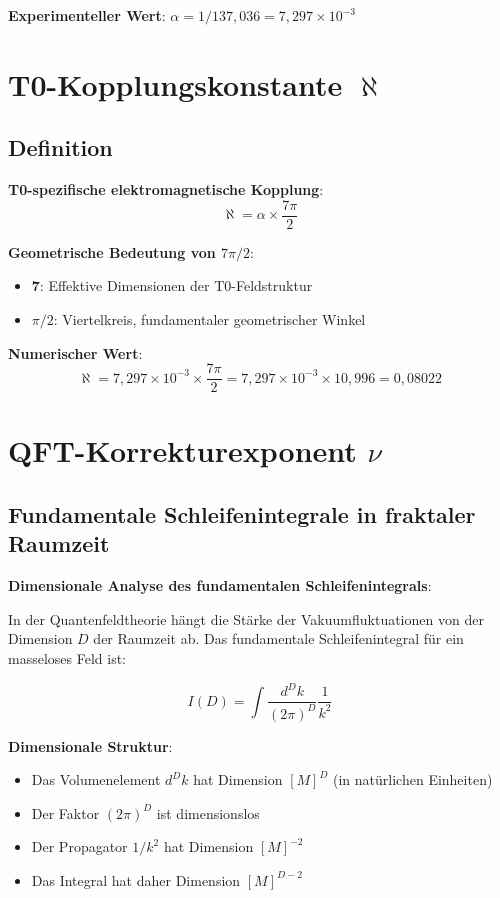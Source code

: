 \documentclass[12pt,a4paper]{article}
\newcommand{\alphagem}{\alpha}
\newcommand{\nulep}{\nu}
\begin{document}
	\textbf{Experimenteller Wert}: $\alphagem = 1/137{,}036 = 7{,}297 \times 10^{-3}$
	
	\section{T0-Kopplungskonstante $\aleph$}
	
	\subsection{Definition}
	
	\textbf{T0-spezifische elektromagnetische Kopplung}:
	\begin{equation}
		\aleph = \alphagem \times \frac{7\pi}{2}
	\end{equation}
	
	\textbf{Geometrische Bedeutung von $7\pi/2$}:
	\begin{itemize}
		\item \textbf{7}: Effektive Dimensionen der T0-Feldstruktur
		\item \textbf{$\pi/2$}: Viertelkreis, fundamentaler geometrischer Winkel
	\end{itemize}
	
	\textbf{Numerischer Wert}:
	\begin{equation}
		\aleph = 7{,}297 \times 10^{-3} \times \frac{7\pi}{2} = 7{,}297 \times 10^{-3} \times 10{,}996 = 0{,}08022
	\end{equation}
	
	\section{QFT-Korrekturexponent $\nulep$}

\subsection{Fundamentale Schleifenintegrale in fraktaler Raumzeit}

\textbf{Dimensionale Analyse des fundamentalen Schleifenintegrals}:

In der Quantenfeldtheorie hängt die Stärke der Vakuumfluktuationen von der Dimension $D$ der Raumzeit ab. Das fundamentale Schleifenintegral für ein masseloses Feld ist:

\begin{equation}
	I(D) = \int \frac{d^D k}{(2\pi)^D} \frac{1}{k^2}
\end{equation}

\textbf{Dimensionale Struktur}:
\begin{itemize}
	\item Das Volumenelement $d^D k$ hat Dimension $[M]^D$ (in natürlichen Einheiten)
	\item Der Faktor $(2\pi)^D$ ist dimensionslos
	\item Der Propagator $1/k^2$ hat Dimension $[M]^{-2}$
	\item Das Integral hat daher Dimension $[M]^{D-2}$
\end{itemize}
\end{document}

